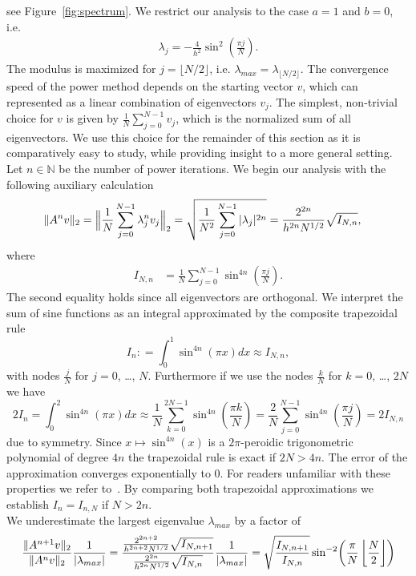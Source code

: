 \documentclass{scrartcl}
\newcommand{\defneq}{\mathrel{\mathop:}=}
\begin{document}
		see Figure~\ref{fig:spectrum}. We restrict our analysis to the case $a=1$ and $b=0$, i.e.
	\begin{align*}
		\lambda_j =-\frac{4}{h^2}\sin^2\!\left(\frac{\pi j}{N}\right).
	\end{align*}
	The modulus is maximized for $j=\lfloor N/2\rfloor$, i.e.  $\lambda_{max} = \lambda_{\lfloor N/2\rfloor}$.
	The convergence speed of the power method depends on the starting vector $v$, which can represented as a linear combination of eigenvectors $v_j$. The simplest, non-trivial choice for $v$ is given by $\frac{1}{N}\sum_{j=0}^{N-1} v_j$, which is the normalized sum of all eigenvectors. We use this choice for the remainder of this section as it is comparatively easy to study, while providing insight to a more general setting. 
	Let $n\in\mathbb{N}$ be the number of power iterations. We begin our analysis with the following auxiliary calculation
	\begin{align*}
		\lVert A^nv\rVert_2
		&= \Big\lVert{\frac{1}{N}\sum_{j=0}^{N-1}\lambda_j^nv_j}\Big\rVert_2
		= \sqrt{\frac{1}{N^2}\sum_{j=0}^{N-1}{\lvert\lambda_j\rvert^{2n}}}
		= \frac{2^{2n}}{h^{2n}N^{1/2}}\sqrt{I_{N,n}} ,
	\end{align*}
	where
	\begin{align*}
		I_{N,n} &= \frac{1}{N}\sum_{j=0}^{N-1} \sin^{4n}\!\left(\frac{\pi j}{N}\right).
	\end{align*}
	The second equality holds since all eigenvectors are orthogonal. We interpret the sum of sine functions as an integral approximated by the composite trapezoidal rule
	\[
		I_n\defneq\int_{0}^{1}{\sin^{4n}\!\left(\pi x\right)}dx \approx I_{N,n},
	\]
	with nodes $\frac{j}{N}$ for $j=0$, \dots, $N$.
	Furthermore if we use the nodes $\frac{k}{N}$ for $k=0$, \dots, $2N$ we have
	\[
		2I_n = \int_{0}^{2}{\sin^{4n}\!\left(\pi x\right)}dx \approx
		\frac{1}{N}\sum_{k=0}^{2N-1}\sin^{4n}\!\left(\frac{\pi k}{N}\right)
		= \frac{2}{N}\sum_{j=0}^{N-1}\sin^{4n}\!\left(\frac{\pi j}{N}\right)
		= 2 I_{N,n}
	\]
	due to symmetry. Since $x\mapsto\sin^{4n}(x)$ is a $2\pi$-peroidic trigonometric polynomial of degree $4n$ the trapezoidal rule is exact if $2N>4n$. The error of the approximation converges exponentially to $0$. For readers unfamiliar with these properties we refer to~\cite[Corollary 3.3]{trapezoidal}. 
	By comparing both trapezoidal approximations we establish $I_n = I_{n,N}$ if $N > 2n$.\\
	We underestimate the largest eigenvalue $\lambda_{max}$ by a factor of
	\begin{align*}
		\frac{\lVert A^{n+1}v\rVert_2}{\lVert A^nv\rVert_2}\frac{1}{\lvert\lambda_{max}\rvert}
		= \frac{\frac{2^{2n+2}}{h^{2n+2}N^{1/2}}\sqrt{I_{N,n+1}}}{\frac{2^{2n}}{h^{2n}N^{1/2}}\sqrt{I_{N,n}}}\frac{1}{\lvert\lambda_{max}\rvert} = \sqrt{\frac{I_{N,n+1}}{I_{N,n}}}\sin^{-2}\!\left(\frac{\pi}{N}\left\lfloor\frac{N}{2}\right\rfloor\right)
	\end{align*}
\end{document}
